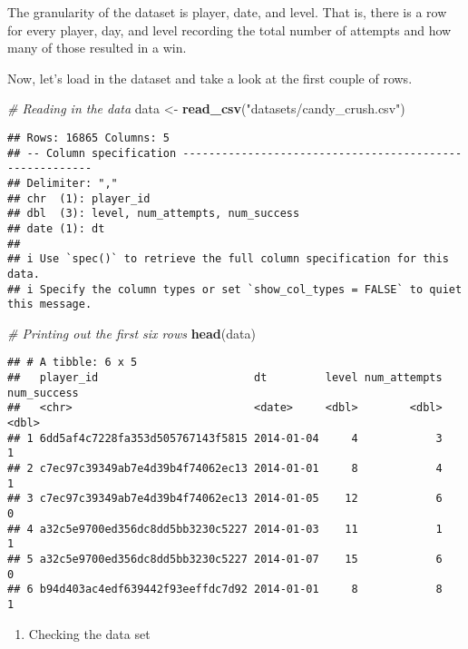 \documentclass[
]{article}
\newenvironment{Shaded}{\begin{snugshade}}{\end{snugshade}}
\newcommand{\CommentTok}[1]{\textcolor[rgb]{0.56,0.35,0.01}{\textit{#1}}}
\newcommand{\FunctionTok}[1]{\textcolor[rgb]{0.13,0.29,0.53}{\textbf{#1}}}
\newcommand{\NormalTok}[1]{#1}
\newcommand{\OtherTok}[1]{\textcolor[rgb]{0.56,0.35,0.01}{#1}}
\newcommand{\StringTok}[1]{\textcolor[rgb]{0.31,0.60,0.02}{#1}}
\providecommand{\tightlist}{%
  \setlength{\itemsep}{0pt}\setlength{\parskip}{0pt}}
\begin{document}
The granularity of the dataset is player, date, and level. That is,
there is a row for every player, day, and level recording the total
number of attempts and how many of those resulted in a win.

Now, let's load in the dataset and take a look at the first couple of
rows.

\begin{Shaded}
\begin{Highlighting}[]
\CommentTok{\# Reading in the data}
\NormalTok{data }\OtherTok{\textless{}{-}} \FunctionTok{read\_csv}\NormalTok{(}\StringTok{"datasets/candy\_crush.csv"}\NormalTok{)}
\end{Highlighting}
\end{Shaded}

\begin{verbatim}
## Rows: 16865 Columns: 5
## -- Column specification --------------------------------------------------------
## Delimiter: ","
## chr  (1): player_id
## dbl  (3): level, num_attempts, num_success
## date (1): dt
## 
## i Use `spec()` to retrieve the full column specification for this data.
## i Specify the column types or set `show_col_types = FALSE` to quiet this message.
\end{verbatim}

\begin{Shaded}
\begin{Highlighting}[]
\CommentTok{\# Printing out the first six rows}
\FunctionTok{head}\NormalTok{(data)}
\end{Highlighting}
\end{Shaded}

\begin{verbatim}
## # A tibble: 6 x 5
##   player_id                        dt         level num_attempts num_success
##   <chr>                            <date>     <dbl>        <dbl>       <dbl>
## 1 6dd5af4c7228fa353d505767143f5815 2014-01-04     4            3           1
## 2 c7ec97c39349ab7e4d39b4f74062ec13 2014-01-01     8            4           1
## 3 c7ec97c39349ab7e4d39b4f74062ec13 2014-01-05    12            6           0
## 4 a32c5e9700ed356dc8dd5bb3230c5227 2014-01-03    11            1           1
## 5 a32c5e9700ed356dc8dd5bb3230c5227 2014-01-07    15            6           0
## 6 b94d403ac4edf639442f93eeffdc7d92 2014-01-01     8            8           1
\end{verbatim}

\begin{enumerate}
\def\labelenumi{\arabic{enumi}.}
\setcounter{enumi}{2}
\tightlist
\item
  Checking the data set
\end{enumerate}
\end{document}
